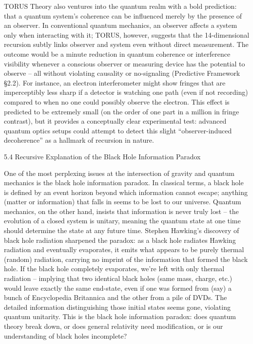 \documentclass[
]{article}
\begin{document}
TORUS Theory also ventures into the quantum realm with a bold
prediction: that a quantum system's coherence can be influenced merely
by the presence of an observer. In conventional quantum mechanics, an
observer affects a system only when interacting with it; TORUS, however,
suggests that the 14-dimensional recursion subtly links observer and
system even without direct measurement. The outcome would be a minute
reduction in quantum coherence or interference visibility whenever a
conscious observer or measuring device has the potential to observe --
all without violating causality or no-signaling (Predictive Framework
§2.2). For instance, an electron interferometer might show fringes that
are imperceptibly less sharp if a detector is watching one path (even if
not recording) compared to when no one could possibly observe the
electron. This effect is predicted to be extremely small (on the order
of one part in a million in fringe contrast), but it provides a
conceptually clear experimental test: advanced quantum optics setups
could attempt to detect this slight ``observer-induced decoherence'' as
a hallmark of recursion in nature.

5.4 Recursive Explanation of the Black Hole Information Paradox

One of the most perplexing issues at the intersection of gravity and
quantum mechanics is the black hole information paradox. In classical
terms, a black hole is defined by an event horizon beyond which
information cannot escape; anything (matter or information) that falls
in seems to be lost to our universe. Quantum mechanics, on the other
hand, insists that information is never truly lost -- the evolution of a
closed system is unitary, meaning the quantum state at one time should
determine the state at any future time. Stephen Hawking's discovery of
black hole radiation sharpened the paradox: as a black hole radiates
Hawking radiation and eventually evaporates, it emits what appears to be
purely thermal (random) radiation, carrying no imprint of the
information that formed the black hole. If the black hole completely
evaporates, we're left with only thermal radiation -- implying that two
identical black holes (same mass, charge, etc.) would leave exactly the
same end-state, even if one was formed from (say) a bunch of
Encyclopedia Britannica and the other from a pile of DVDs. The detailed
information distinguishing those initial states seems gone, violating
quantum unitarity. This is the black hole information paradox: does
quantum theory break down, or does general relativity need modification,
or is our understanding of black holes incomplete?
\end{document}
